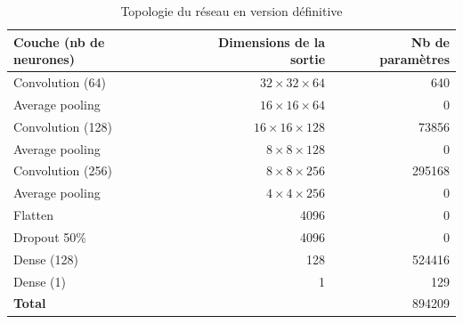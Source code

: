 \documentclass[a4paper, 11pt]{report}
\begin{document}
\begin{table}[h]
\centering
\caption{Topologie du réseau en version définitive}
\begin{tabular}{ l r r }
	\hline
	\textbf{Couche (nb de neurones)} & \textbf{Dimensions de la sortie} & \textbf{Nb de paramètres} \\
	\hline\hline
	Convolution (64) & $32 \times 32 \times 64$ & 640 \\
	\hline
	Average pooling & $16 \times 16 \times 64$ & 0 \\
	\hline
	Convolution (128) & $16 \times 16 \times 128$ & 73856 \\
	\hline
	Average pooling & $8 \times 8 \times 128$ & 0 \\
	\hline
	Convolution (256) & $8 \times 8 \times 256$ & 295168 \\
	\hline
	Average pooling & $4 \times 4 \times 256$ & 0 \\
	\hline
	Flatten & 4096 & 0 \\
	\hline
	Dropout 50\% & 4096 & 0 \\
	\hline
	Dense (128) & 128 & 524416 \\
	\hline
	Dense (1) & 1 & 129 \\
	\hline\hline
	\textbf{Total} &  & 894209 \\
	\hline
\end{tabular}
\label{topologie}
\end{table}
\end{document}
